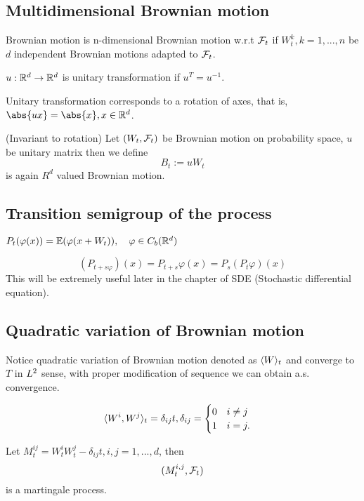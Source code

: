 \subsection{Multidimensional Brownian motion}
Brownian motion is n-dimensional Brownian motion w.r.t $\mathcal{F}_t$ if $W_t^k, k = 1, ..., n$ be $d$ independent Brownian motions adapted to $\mathcal{F}_t$.
\begin{dfn}
$u: \mathbb{R}^d \rightarrow \mathbb{R}^d$ is unitary transformation if $u^T = u^{-1}$.
\end{dfn}
Unitary transformation corresponds to a rotation of axes, that is, $\abs{ux} = \abs{x}, x\in \R^d$.
\begin{thm}{(Invariant to rotation)}
Let $(W_t, \mathcal{F}_t)$ be Brownian motion on probability space, $u$ be unitary matrix then we define 
\begin{equation*}
    B_t := u W_t
\end{equation*} is again $R^d$ valued Brownian motion.
\end{thm}

\subsection{Transition semigroup of the process}
$P_t(\varphi(x)) = \mathbb{E}(\varphi(x + W_t)), \quad \varphi\in C_b(\mathbb{R}^d)$

\begin{equation*}
    (P_{t+s \varphi})(x) = P_{t+s}\varphi (x) = P_s(P_t\varphi)(x)
\end{equation*}
This will be extremely useful later in the chapter of SDE (Stochastic differential equation).

\subsection{Quadratic variation of Brownian motion}
Notice quadratic variation of Brownian motion denoted as $\langle{W} \rangle_{t}$ and converge to $T$ in $L^{2}$ sense, with proper modification of sequence we can obtain a.s. convergence.

\begin{equation*}
\langle{W^i},{W^j} \rangle_t = \delta_{ij} t , \delta_{ij} = \begin{cases}
0 \quad i\neq j \\
1 \quad i = j.
\end{cases}
\end{equation*}

\begin{thm}
Let $M_t^{ij} = W_t^i W_t^j - \delta_{ij} t, i,j = 1,...,d$, then \begin{equation*}
    (M_t^{i,j}, \mathcal{F}_t)
\end{equation*} is a martingale process.
\end{thm}

